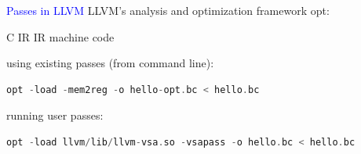 \begin{frame}[fragile]{\textcolor{blue}{Passes in LLVM}}
LLVM's analysis and optimization framework {\color{blue} opt}:

\begin{center}
C  
IR
IR
machine code
\end{center}

\vspace{-0.3cm}

\hspace{4.0cm}

\vspace{0.9cm}

using existing passes (from command line):
\begin{footnotesize}
\begin{lstlisting}[language=C++]
opt -load -mem2reg -o hello-opt.bc < hello.bc
\end{lstlisting}
\end{footnotesize}
running user passes:
\begin{footnotesize}
\begin{lstlisting}[language=C++]
opt -load llvm/lib/llvm-vsa.so -vsapass -o hello.bc < hello.bc
\end{lstlisting}
\end{footnotesize}

\end{frame}
